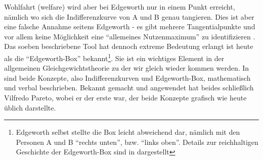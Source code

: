 Wohlfahrt (welfare) wird aber bei Edgeworth nur in einem Punkt erreicht, nämlich wo sich die Indifferenzkurve von A und B genau tangieren. Dies ist aber eine falsche Annahme seitens Edgeworth - es gibt mehrere Tangentialpunkte und vor allem keine Möglichkeit eine "`allemeines Nutzenmaximum"' zu identifizieren \parencite[S. 49]{Humphrey1996}. Das soeben beschriebene Tool hat dennoch extreme Bedeutung erlangt ist heute als die "`Edgeworth-Box"' bekannt\footnote{Edgeworth selbst stellte die Box leicht abweichend dar, nämlich mit den Personen A und B "`rechts unten"', bzw. "`links oben"'. Details zur reichhaltigen Geschichte der Edgeworth-Box sind in \textcite{Humphrey1996} dargestellt}. Sie ist ein wichtiges Element in der allgemeinen Gleichgewichtstheorie zu der wir gleich wieder kommen werden. In \textcite{Edgeworth1881} sind beide Konzepte, also Indifferenzkurven und Edgeworth-Box, mathematisch und verbal beschrieben. Bekannt gemacht und angewendet hat beides schließlich Vilfredo Pareto, wobei er der erste war, der beide Konzepte grafisch wie heute üblich darstellte.

